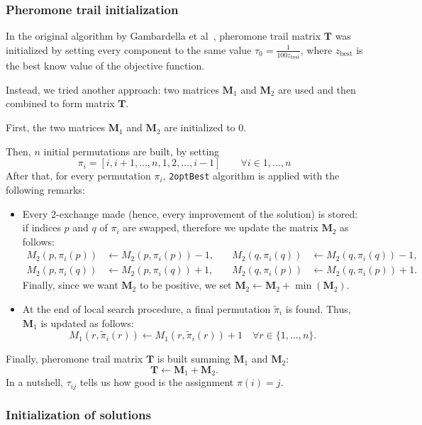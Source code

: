 \subsubsection{Pheromone trail initialization}


In the original algorithm by Gambardella et al~\cite{Gambardella1999}, pheromone trail matrix $\bm T$ was initialized by setting every component to the same value $\tau_0=\frac{1}{100 z_\mathrm{best}}$, where $z_\mathrm{best}$ is the best know value of the objective function. 

Instead, we tried another approach: two matrices $\bm M_1$ and $\bm M_2$ are used and then combined to form matrix $\bm T$. 

First, the two matrices $\bm M_1$ and $\bm M_2$ are initialized to $0$. 

Then, $n$ initial permutations are built, by setting
\[
\pi_i= [i,i+1,\dots,n,1,2,\dots,i-1] \qquad \forall i\in{1,\dots,n}
\]
After that, for every permutation $\pi_i$,  \texttt{2optBest} algorithm is applied with the following remarks:
\begin{itemize}
	\item Every $2$-exchange made (hence, every improvement of the solution) is stored: if indices $p$ and $q$  of $\pi_i$ are swapped, therefore  we update the matrix $\bm M_2$ as follows:
	\begin{align*}
	M_2(p,\pi_i(p)) &\gets 	M_2(p,\pi_i(p)) -1, &\quad  M_2(q,\pi_i(q)) &\gets 	M_2(q,\pi_i(q)) -1,\\
	M_2(p,\pi_i(q)) &\gets 	M_2(p,\pi_i(q)) +1, &\quad  M_2(q,\pi_i(p)) &\gets 	M_2(q,\pi_i(p)) +1.
	\end{align*} 
	Finally, since we want $\bm M_2$ to be positive, we set $\bm M_2 \gets \bm M_2 + \min(\bm M_2)$.
	\item At the end of  local search procedure, a final permutation $\tilde{\pi}_i$ is found. Thus, $\bm M_1$ is updated as follows:
	\[
	M_1(r,\tilde{\pi}_i(r)) \gets 	M_1(r,\tilde{\pi}_i(r))+1 \quad \forall r \in \{1,\dots,n\}.
	\]
\end{itemize}

\noindent Finally, pheromone trail matrix $\bm T$ is built summing $\bm M_1$ and $\bm M_2$: \[ \bm T \gets \bm M_1 + \bm M_2.\]
In a nutshell, $\tau_{ij}$ tells us how good is the assignment $\pi(i)=j$. 
\subsubsection{Initialization of solutions}


